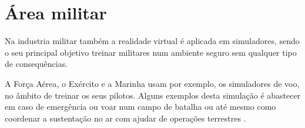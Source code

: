 \section{Área militar}

Na industria militar também a realidade virtual é aplicada em simuladores, sendo o seu principal objetivo treinar militares num ambiente seguro sem qualquer tipo de consequências. 

A Força Aérea, o Exército e a Marinha usam por exemplo, os simuladores de voo, no âmbito de treinar os seus pilotos. Alguns exemplos desta simulação é abastecer em caso de emergência ou voar num campo de batalha ou até mesmo como coordenar a sustentação no ar com ajudar de operações terrestres \cite{RV_militar}.





